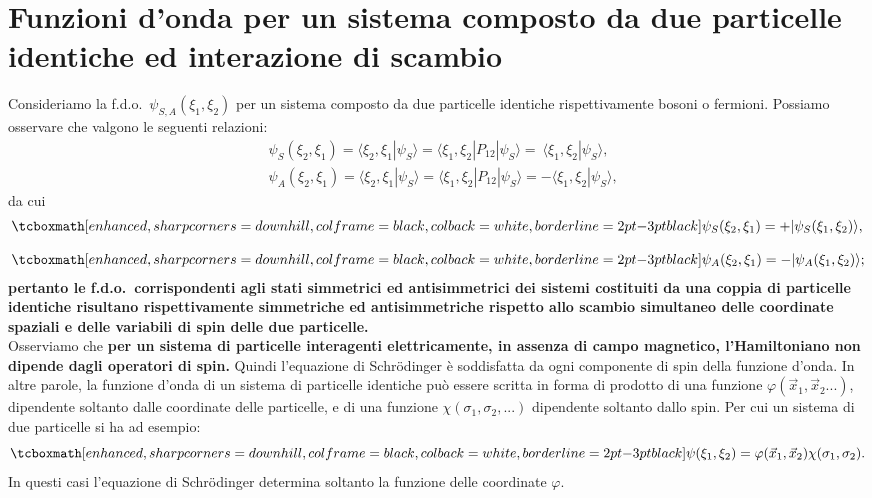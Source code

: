 \section{Funzioni d'onda per un sistema  composto da due particelle identiche  ed interazione di scambio}
Consideriamo la f.d.o.~$\psi_{S,A} (\xi_1 ,\xi_2)$ per un sistema composto da due particelle identiche rispettivamente bosoni o fermioni. Possiamo osservare che valgono le seguenti relazioni:
	\begin{align}
		& \psi_S (\xi_2, \xi_1) =\langle \xi_2, \xi_1|\psi_S\rangle= \langle \xi_1, \xi_2|P_{12}|\psi_S\rangle=~\langle \xi_1, \xi_2|\psi_S \rangle  , \\[0.3cm] 
		& \psi_A (\xi_2, \xi_1) =\langle \xi_2, \xi_1|\psi_S\rangle= \langle \xi_1, \xi_2|P_{12}|\psi_S\rangle=-\langle \xi_1, \xi_2|\psi_S\rangle ,
	\end{align}
da cui
	\begin{align}
		&\tcboxmath[enhanced, sharp corners=downhill, colframe=black, colback=white, borderline={2pt}{-3pt}{black}]{
			\psi_S (\xi_2, \xi_1) = +|\psi_S(\xi_1, \xi_2)\rangle ,
		}\\[0.3cm]
		&\tcboxmath[enhanced, sharp corners=downhill, colframe=black, colback=white, borderline={2pt}{-3pt}{black}]{
			\psi_A (\xi_2, \xi_1) = -|\psi_A(\xi_1, \xi_2)\rangle ;
		}
	\end{align}
\textbf{pertanto le f.d.o.~corrispondenti agli stati simmetrici ed antisimmetrici dei sistemi costituiti da una coppia di particelle identiche risultano rispettivamente simmetriche ed antisimmetriche rispetto allo scambio simultaneo delle coordinate spaziali e delle variabili di spin delle due particelle.}\\

Osserviamo che \textbf{per un sistema di particelle interagenti elettricamente, in assenza di campo magnetico, l'Hamiltoniano non dipende dagli operatori di spin.} Quindi l'equazione di Schr\"{o}dinger è soddisfatta da ogni componente di spin della funzione d'onda. In altre parole, la funzione d'onda di un sistema di particelle identiche può essere scritta in forma di prodotto di una funzione $\varphi(\vec{x}_1, \vec{x}_2...)$, dipendente soltanto dalle coordinate delle particelle, e di una funzione $\chi(\sigma_1,\sigma_2,...)$ dipendente soltanto dallo spin. Per cui un sistema di due particelle si ha ad esempio:
	\begin{equation}
		\tcboxmath[enhanced, sharp corners=downhill, colframe=black, colback=white, borderline={2pt}{-3pt}{black}]{
			\psi(\xi_1, \xi_2)= \varphi(\vec{x}_1, \vec{x}_2)\chi(\sigma_1, \sigma_2) .
			}
	\end{equation}
In questi casi l'equazione di Schr\"{o}dinger determina soltanto la funzione delle coordinate $\varphi$.\\

